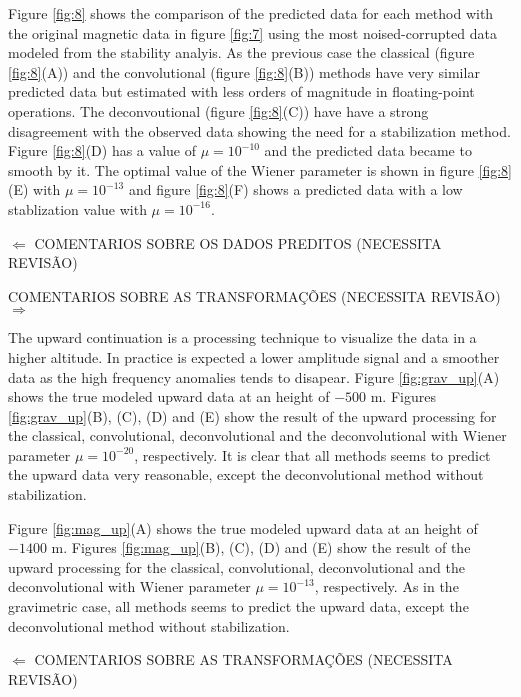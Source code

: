 Figure \ref{fig:8} shows the comparison of the predicted data for each method with the original magnetic data in figure \ref{fig:7} using the most noised-corrupted data modeled from the stability analyis. As the previous case the classical (figure \ref{fig:8}(A)) and the convolutional (figure \ref{fig:8}(B)) methods have very similar predicted data but estimated with less orders of magnitude in floating-point operations. The deconvoutional (figure \ref{fig:8}(C)) have have a strong disagreement with the observed data showing the need for a stabilization method.
Figure \ref{fig:8}(D) has a value of $\mu = 10^{-10}$ and the predicted data became to smooth by it. The optimal value of the Wiener parameter is shown in figure \ref{fig:8}(E) with $\mu = 10^{-13}$ and figure \ref{fig:8}(F) shows a predicted data with a low stablization value with $\mu = 10^{-16}$.

$\Longleftarrow$ COMENTARIOS SOBRE OS DADOS PREDITOS (NECESSITA REVISÃO)

COMENTARIOS SOBRE AS TRANSFORMAÇÕES (NECESSITA REVISÃO) $\Longrightarrow$

The upward continuation is a processing technique to visualize the data in a higher altitude. In practice is expected a lower amplitude signal and a smoother data as the high frequency anomalies tends to disapear. Figure  \ref{fig:grav_up}(A) shows the true modeled upward data at an height of $-500$ m. Figures \ref{fig:grav_up}(B), (C), (D) and (E) show the result of the upward processing for the classical, convolutional, deconvolutional and the deconvolutional with Wiener parameter $\mu = 10^{-20}$, respectively. It is clear that all methods seems to predict the upward data very reasonable, except the deconvolutional method without stabilization.

Figure \ref{fig:mag_up}(A) shows the true modeled upward data at an height of $-1400$ m. Figures \ref{fig:mag_up}(B), (C), (D) and (E) show the result of the upward processing for the classical, convolutional, deconvolutional and the deconvolutional with Wiener parameter $\mu = 10^{-13}$, respectively. As in the gravimetric case, all methods seems to predict the upward data, except the deconvolutional method without stabilization.

$\Longleftarrow$ COMENTARIOS SOBRE AS TRANSFORMAÇÕES (NECESSITA REVISÃO)

